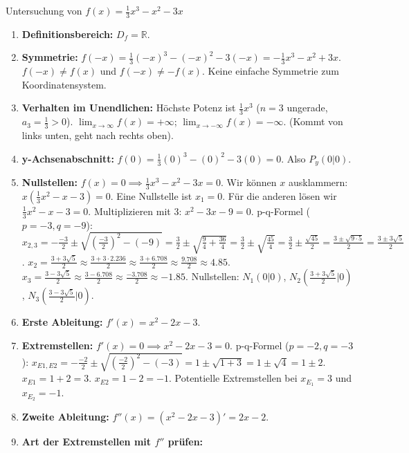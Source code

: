 \begin{beispielumgebung}{Untersuchung von $f(x) = \frac{1}{3}x^3 - x^2 - 3x$}
\begin{enumerate}
    \item \textbf{Definitionsbereich:} $D_f = \mathbb{R}$.
    \item \textbf{Symmetrie:}
        $f(-x) = \frac{1}{3}(-x)^3 - (-x)^2 - 3(-x) = -\frac{1}{3}x^3 - x^2 + 3x$.
        $f(-x) \neq f(x)$ und $f(-x) \neq -f(x)$. Keine einfache Symmetrie zum Koordinatensystem.
    \item \textbf{Verhalten im Unendlichen:} Höchste Potenz ist $\frac{1}{3}x^3$ ($n=3$ ungerade, $a_3=\frac{1}{3}>0$).
        $\lim_{x \to \infty} f(x) = +\infty$; $\lim_{x \to -\infty} f(x) = -\infty$. (Kommt von links unten, geht nach rechts oben).
    \item \textbf{y-Achsenabschnitt:} $f(0) = \frac{1}{3}(0)^3 - (0)^2 - 3(0) = 0$. Also $P_y(0|0)$.
    \item \textbf{Nullstellen:} $f(x)=0 \implies \frac{1}{3}x^3 - x^2 - 3x = 0$.
        Wir können $x$ ausklammern: $x(\frac{1}{3}x^2 - x - 3) = 0$.
        Eine Nullstelle ist $x_1 = 0$.
        Für die anderen lösen wir $\frac{1}{3}x^2 - x - 3 = 0$. Multiplizieren mit 3: $x^2 - 3x - 9 = 0$.
        p-q-Formel ($p=-3, q=-9$):
        $x_{2,3} = - \frac{-3}{2} \pm \sqrt{(\frac{-3}{2})^2 - (-9)} = \frac{3}{2} \pm \sqrt{\frac{9}{4} + \frac{36}{4}} = \frac{3}{2} \pm \sqrt{\frac{45}{4}} = \frac{3}{2} \pm \frac{\sqrt{45}}{2} = \frac{3 \pm \sqrt{9 \cdot 5}}{2} = \frac{3 \pm 3\sqrt{5}}{2}$.
        $x_2 = \frac{3 + 3\sqrt{5}}{2} \approx \frac{3 + 3 \cdot 2.236}{2} \approx \frac{3+6.708}{2} \approx \frac{9.708}{2} \approx 4.85$.
        $x_3 = \frac{3 - 3\sqrt{5}}{2} \approx \frac{3 - 6.708}{2} \approx \frac{-3.708}{2} \approx -1.85$.
        Nullstellen: $N_1(0|0)$, $N_2(\frac{3+3\sqrt{5}}{2}|0)$, $N_3(\frac{3-3\sqrt{5}}{2}|0)$.
    \item \textbf{Erste Ableitung:} $f'(x) = x^2 - 2x - 3$.
    \item \textbf{Extremstellen:} $f'(x)=0 \implies x^2 - 2x - 3 = 0$.
        p-q-Formel ($p=-2, q=-3$):
        $x_{E1,E2} = - \frac{-2}{2} \pm \sqrt{(\frac{-2}{2})^2 - (-3)} = 1 \pm \sqrt{1+3} = 1 \pm \sqrt{4} = 1 \pm 2$.
        $x_{E1} = 1+2 = 3$.
        $x_{E2} = 1-2 = -1$.
        Potentielle Extremstellen bei $x_{E_1}=3$ und $x_{E_2}=-1$.
    \item \textbf{Zweite Ableitung:} $f''(x) = (x^2 - 2x - 3)' = 2x - 2$.
    \item \textbf{Art der Extremstellen mit $f''$ prüfen:}

\end{enumerate}
\end{beispielumgebung}

